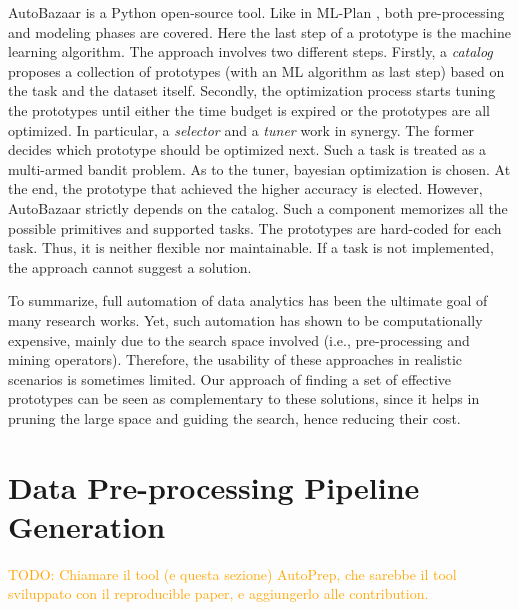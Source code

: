 AutoBazaar \cite{AutoBazaar} is a Python open-source tool.
Like in ML-Plan \cite{mohr2018ml}, both pre-processing and modeling phases are covered.
Here the last step of a prototype is the machine learning algorithm.
The approach involves two different steps.
Firstly, a \textit{catalog} proposes a collection of prototypes (with an ML algorithm as last step) based on the task and the dataset itself.
Secondly, the optimization process starts tuning the prototypes until either the time budget is expired or the prototypes are all optimized.
In particular, a \textit{selector} and a \textit{tuner} work in synergy.
The former decides which prototype should be optimized next.
Such a task is treated as a multi-armed bandit problem.
As to the tuner, bayesian optimization is chosen.
At the end, the prototype that achieved the higher accuracy is elected.
However, AutoBazaar strictly depends on the catalog.
Such a component memorizes all the possible primitives and supported tasks.
The prototypes are hard-coded for each task.
Thus, it is neither flexible nor maintainable.
If a task is not implemented, the approach cannot suggest a solution.

To summarize, full automation of data analytics has been the ultimate goal of many research works.
Yet, such automation has shown to be computationally expensive, mainly due to the search space involved (i.e., pre-processing and mining operators).
Therefore, the usability of these approaches in realistic scenarios is sometimes limited.
Our approach of finding a set of effective prototypes can be seen as complementary to these solutions, since it helps in pruning the large space and guiding the search, hence reducing their cost.

\section{Data Pre-processing Pipeline Generation}
\label{effective-sec:methodology}

\textcolor{orange}{TODO: Chiamare il tool (e questa sezione) AutoPrep, che sarebbe il tool sviluppato con il reproducible paper, e aggiungerlo alle contribution.}

